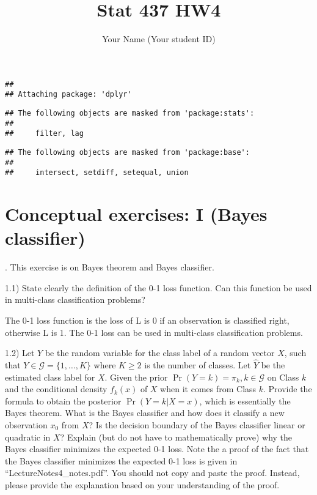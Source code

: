 \documentclass[
  11pt,
]{article}
\title{Stat 437 HW4}
\author{Your Name (Your student ID)}
\date{}
\begin{document}
\maketitle

\begin{verbatim}
## 
## Attaching package: 'dplyr'
\end{verbatim}

\begin{verbatim}
## The following objects are masked from 'package:stats':
## 
##     filter, lag
\end{verbatim}

\begin{verbatim}
## The following objects are masked from 'package:base':
## 
##     intersect, setdiff, setequal, union
\end{verbatim}

\hypertarget{conceptual-exercises-i-bayes-classifier}{%
\section{Conceptual exercises: I (Bayes
classifier)}\label{conceptual-exercises-i-bayes-classifier}}

. This exercise is on Bayes theorem and Bayes classifier.

1.1) State clearly the definition of the 0-1 loss function. Can this
function be used in multi-class classification problems?

The 0-1 loss function is the loss of L is 0 if an observation is
classified right, otherwise L is 1. The 0-1 loss can be used in
multi-class classification problems.

1.2) Let \(Y\) be the random variable for the class label of a random
vector \(X\), such that \(Y \in \mathcal{G}=\{1,\ldots, K\}\) where
\(K \ge 2\) is the number of classes. Let \(\hat{Y}\) be the estimated
class label for \(X\). Given the prior
\(\Pr(Y=k)=\pi_k, k \in \mathcal{G}\) on Class \(k\) and the conditional
density \(f_k(x)\) of \(X\) when it comes from Class \(k\). Provide the
formula to obtain the posterior \(\Pr(Y=k|X=x)\), which is essentially
the Bayes theorem. What is the Bayes classifier and how does it classify
a new observation \(x_0\) from \(X\)? Is the decision boundary of the
Bayes classifier linear or quadratic in \(X\)? Explain (but do not have
to mathematically prove) why the Bayes classifier minimizes the expected
0-1 loss. Note the a proof of the fact that the Bayes classifier
minimizes the expected 0-1 loss is given in
``LectureNotes4\_notes.pdf''. You should not copy and paste the proof.
Instead, please provide the explanation based on your understanding of
the proof.
\end{document}
